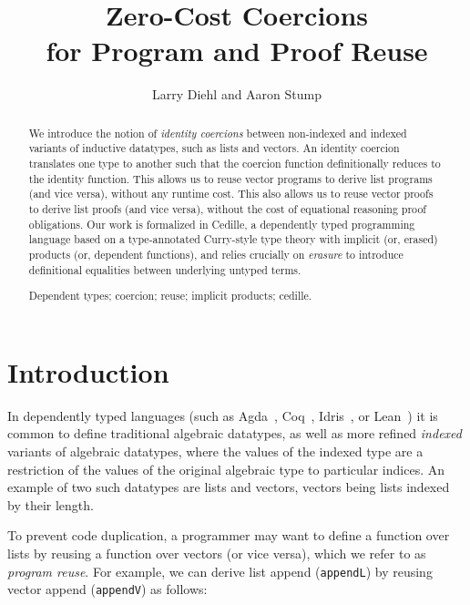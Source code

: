 \documentclass[a4paper,envcountsame,envcountsect]{llncs}
\newcommand{\keywords}[1]{\par\addvspace\baselineskip
\noindent\keywordname\enspace\ignorespaces#1}
\newcommand{\labsec}[1]{\label{sec:#1}}
\begin{document}

\mainmatter
\title{Zero-Cost Coercions \\for Program and Proof Reuse}
\author{Larry Diehl and Aaron Stump}
\maketitle

\begin{abstract}
  We introduce the notion of \textit{identity coercions} between
  non-indexed and indexed variants of inductive datatypes, such as lists and
  vectors. An identity coercion translates one type to another such that
  the coercion function definitionally reduces to the identity
  function. This allows us to reuse vector programs to derive list
  programs (and vice versa), without any runtime cost. This also
  allows us to reuse vector proofs to derive list proofs (and vice
  versa), without the cost of equational reasoning proof obligations.
  Our work is formalized in Cedille, a dependently typed programming
  language based on a type-annotated Curry-style type theory with
  implicit (or, erased) products (or, dependent functions), and relies
  crucially on \textit{erasure} to introduce definitional
  equalities between underlying untyped terms.

\keywords{
Dependent types; coercion; reuse; implicit products; cedille.
}

\end{abstract}

\section{Introduction}
\labsec{intro}

In dependently typed languages
(such as Agda~\cite{lang:agda}, Coq~\cite{lang:coq},
Idris~\cite{lang:idris}, or Lean~\cite{lang:lean})
it is common to define traditional algebraic datatypes,
as well as more refined \textit{indexed} variants
of algebraic datatypes, where the values of the indexed type are a
restriction of the values of the original algebraic type to particular indices.
An example of two such datatypes are lists and vectors, vectors being
lists indexed by their length.

To prevent code duplication, a programmer may want to define a
function over lists by reusing a function over vectors (or vice versa),
which we refer to as \textit{program reuse}.
For example, we can derive list append (\texttt{appendL}) by reusing
vector append (\texttt{appendV}) as follows:
\end{document}
